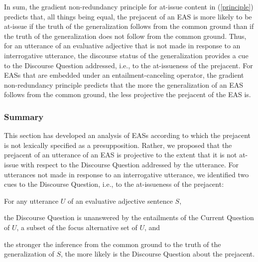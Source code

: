 \documentclass[11pt,fleqn]{article}
\newcommand{\6}{\mbox{$[\hspace*{-.6mm}[$}}
\newcommand{\9}{\mbox{$]\hspace*{-.6mm}]$}}
\begin{document}
In sum, the gradient non-redundancy principle for at-issue content in (\ref{principle}) predicts that, all things being equal, the prejacent of an EAS is more likely to be at-issue if the truth of the generalization follows from the common ground than if the truth of the generalization does not follow from the common ground. Thus, for an utterance of an evaluative adjective that is not made in response to an interrogative utterance, the discourse status of the generalization provides a cue to the Discourse Question addressed, i.e., to the at-issueness of the prejacent. For EASs that are embedded under an entailment-canceling operator, the gradient non-redundancy principle predicts that the more the generalization of an EAS follows from the common ground, the less projective the prejacent of the EAS is.

\subsubsection{Summary}

This section has developed an analysis of EASs according to which the prejacent is not lexically specified as a presupposition. Rather, we proposed that the prejacent of an utterance of an EAS is projective to the extent that it is not at-issue with respect to the Discourse Question addressed by the utterance. For utterances not made in response to an interrogative utterance, we identified two cues to the Discourse Question, i.e., to the at-issueness of the prejacent:

\begin{exe}
\ex\label{cq-eval} For any utterance $U$ of an evaluative adjective sentence $S$,

\begin{xlist}

\ex the Discourse Question is unanswered by the entailments of the Current Question of $U$, a subset of the focus alternative set of $U$, and

\ex the stronger the inference from the common ground to the truth of the generalization of $S$, the more likely is the Discourse Question about the prejacent.

\end{xlist}

\end{exe}
\end{document}
